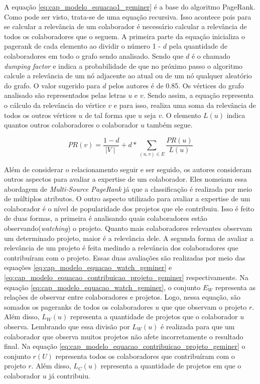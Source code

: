 A equação \ref{eq:cap_modelo_equacao1_geminer} é a base do algoritmo PageRank. Como pode ser visto, trata-se de uma equação recursiva. Isso acontece pois para se calcular a relevância de um colaborador é necessário calcular a relevância de todos os colaboradores que o seguem. A primeira parte da equação inicializa o pagerank de cada elemento ao dividir o número 1 - $d$ pela quantidade de colaboradores em todo o grafo sendo analisado. Sendo que $d$ é o chamado \textit{dumping factor} e indica a probabilidade de que no próximo passo o algoritmo calcule a relevância de um nó adjacente ao atual ou de um nó qualquer aleatório do grafo.  O valor sugerido para  $d$  pelos autores é de 0.85. Os vértices do grafo analisado são representados pelas letras $u$ e $v$. Sendo assim, a equação representa o cálculo da relevância do vértice $v$ e para isso, realiza uma soma da relevância de todos os outros vértices $u$ de tal forma que $u$ seja $v$. O elemento  $L(u)$ indica quantos outros colaboradores o colaborador $u$ também segue. 

\begin{equation}
\label{eq:cap_modelo_equacao1_geminer}
PR(v) =  \frac{1-d}{\mid V \mid} + d *  \sum_{(u,v) \in E}  \frac{PR(u)}{L(u)}
\end{equation}

Além de considerar o relacionamento seguir e ser seguido, os autores consideram outros aspectos para avaliar a expertise de um colaborador. Eles nomeiam essa abordagem de \textit{Multi-Source PageRank} já que a classificação é realizada por meio de múltiplos atributos.   O outro aspecto utilizado para avaliar a expertise de um colaborador é o nível de popularidade dos projetos que ele contribuiu. Isso é feito de duas formas, a primeira é analisando quais colaboradores estão observando(\textit{watching}) o projeto. Quanto mais colaboradores relevantes observam um determinado projeto, maior é a relevância dele. A segunda forma de avaliar a relevância de um projeto é feita medindo a relevância dos colaboradores que contribuíram com o projeto.  Essas duas avaliações são realizadas por meio das equações \ref{eq:cap_modelo_equacao_watch_geminer} e \ref{eq:cap_modelo_equacao_contribuicao_projeto_geminer}  respectivamente. Na equação \ref{eq:cap_modelo_equacao_watch_geminer}, o conjunto $E_W$ representa as relações de observar entre colaboradores e projetos. Logo, nessa equação, são somados os pageranks de todos os colaboradores $u$ que que observam o projeto $r$. Além disso, $L_W(u)$ representa a quantidade de projetos que o colaborador $u$ observa. Lembrando que essa divisão por  $L_W(u)$ é realizada para que um colaborador que observa muitos projetos não afete incorretamente o resultado final.  Na equação \ref{eq:cap_modelo_equacao_contribuicao_projeto_geminer} o conjunto $r(U)$ representa todos os colaboradores que contribuíram com o projeto $r$. Além disso, $L_C(u)$ representa a quantidade de projetos em que o colaborador $u$ já contribuiu.








